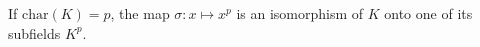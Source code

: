 If $\text{char}(K) = p$, the map $\sigma: x \mapsto x^p$ is an isomorphism of $K$ onto one of its subfields $K^p$.
